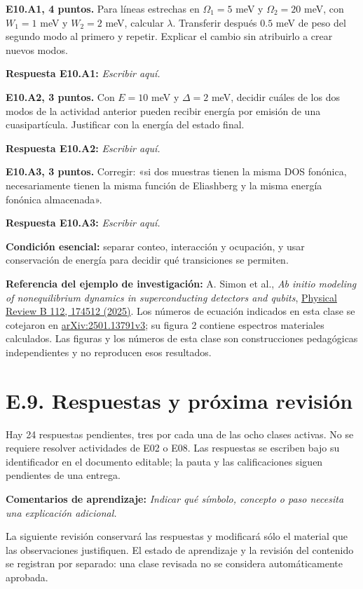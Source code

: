 \documentclass[
  spanish,
  10pt,
  a4paper,
]{article}
\newcounter{none} %
\begin{document}

\textbf{E10.A1, 4 puntos.} Para líneas estrechas en \(\Omega_1=5\) meV y
\(\Omega_2=20\) meV, con \(W_1=1\) meV y \(W_2=2\) meV, calcular
\(\lambda\). Transferir después \(0.5\) meV de peso del segundo modo al
primero y repetir. Explicar el cambio sin atribuirlo a crear nuevos
modos.

\textbf{Respuesta E10.A1:} \emph{Escribir aquí.}


\textbf{E10.A2, 3 puntos.} Con \(E=10\) meV y \(\Delta=2\) meV, decidir
cuáles de los dos modos de la actividad anterior pueden recibir energía
por emisión de una cuasipartícula. Justificar con la energía del estado
final.

\textbf{Respuesta E10.A2:} \emph{Escribir aquí.}


\textbf{E10.A3, 3 puntos.} Corregir: «si dos muestras tienen la misma
DOS fonónica, necesariamente tienen la misma función de Eliashberg y la
misma energía fonónica almacenada».

\textbf{Respuesta E10.A3:} \emph{Escribir aquí.}

\textbf{Condición esencial:} separar conteo, interacción y ocupación, y
usar conservación de energía para decidir qué transiciones se permiten.

\textbf{Referencia del ejemplo de investigación:} A. Simon et al.,
\emph{Ab initio modeling of nonequilibrium dynamics in superconducting
detectors and qubits},
\href{https://journals.aps.org/prb/abstract/10.1103/3m2k-mzr6}{Physical
Review B 112, 174512 (2025)}. Los números de ecuación indicados en esta
clase se cotejaron en
\href{https://arxiv.org/html/2501.13791v3}{arXiv:2501.13791v3}; su
figura 2 contiene espectros materiales calculados. Las figuras y los
números de esta clase son construcciones pedagógicas independientes y no
reproducen esos resultados.


\bigskip

\section{E.9. Respuestas y próxima
revisión}\label{e.9.-respuestas-y-pruxf3xima-revisiuxf3n}

Hay 24 respuestas pendientes, tres por cada una de las ocho clases
activas. No se requiere resolver actividades de E02 o E08. Las
respuestas se escriben bajo su identificador en el documento editable;
la pauta y las calificaciones siguen pendientes de una entrega.

\textbf{Comentarios de aprendizaje:} \emph{Indicar qué símbolo, concepto
o paso necesita una explicación adicional.}

La siguiente revisión conservará las respuestas y modificará sólo el
material que las observaciones justifiquen. El estado de aprendizaje y
la revisión del contenido se registran por separado: una clase revisada
no se considera automáticamente aprobada.
\end{document}
